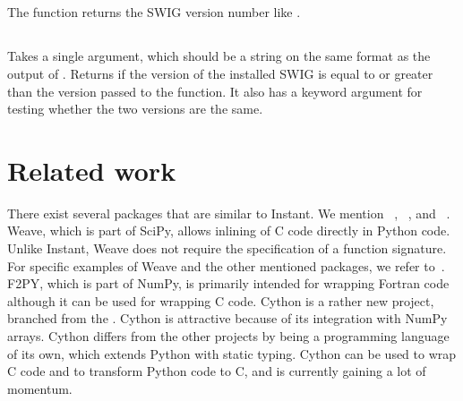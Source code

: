 \subsection[get\_swig\_version]{}

The function returns the SWIG version number like .

\subsection[check\_swig\_version]{}

Takes a single argument, which should be a string on the same format
as the output of . Returns  if
the version of the installed SWIG is equal to or greater than the version
passed to the function. It also has a keyword
argument  for testing whether the two versions are the same.

\section{Related work}

There exist several packages that are similar to Instant.
We mention  ~\citet{www:weave},
~\citet{EwingBradshawBehnelEtAl2009}, and
~\citet{Peterson}.  Weave, which is part of SciPy, allows inlining of
C code directly in Python code.  Unlike Instant, Weave does not
require the specification of a function signature. For specific
examples of Weave and the other mentioned packages, we refer
to~\citep{WilbersLangtangenOdegaard2009}. F2PY, which is part of NumPy, is
primarily intended for wrapping Fortran code although it can be used
for wrapping C code.  Cython is a rather new project, branched from
the \citet{Ewing2009}. Cython is attractive because of  its integration
with NumPy arrays. Cython differs from the other projects by being a programming
language of its own, which extends Python with static typing.
Cython can be used to wrap C code and to transform Python code to C, and is currently gaining a lot of momentum.
